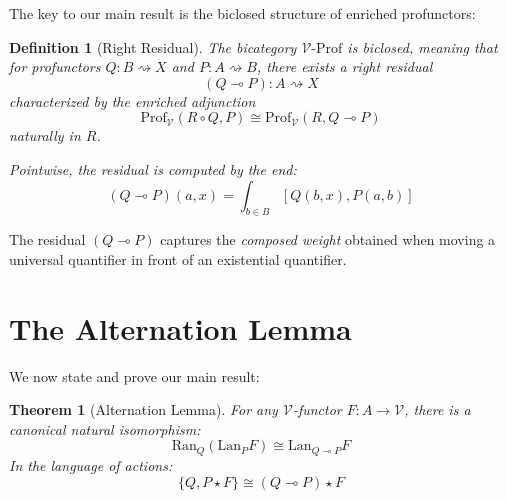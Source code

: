 \documentclass[11pt]{article}
\numberwithin{equation}{section}
\theoremstyle{upright}
\newtheorem{theorem}{Theorem}
\newtheorem{definition}{Definition}
\newcommand{\V}{\mathcal{V}}
\newcommand{\Prof}{\mathrm{Prof}}
\newcommand{\ProfV}{\Prof_{\V}}
\newcommand{\Lan}{\mathrm{Lan}}
\newcommand{\Ran}{\mathrm{Ran}}
\newcommand{\profto}{\rightsquigarrow}
\begin{document}
The key to our main result is the biclosed structure of enriched profunctors:

\begin{definition}[Right Residual]
The bicategory $\V\text{-}\Prof$ is \emph{biclosed}, meaning that for profunctors $Q: B \profto X$ and $P: A \profto B$, there exists a \emph{right residual}
\begin{equation}
(Q \multimap P): A \profto X
\end{equation}
characterized by the enriched adjunction
\begin{equation}
\ProfV(R \circ Q, P) \cong \ProfV(R, Q \multimap P)
\end{equation}
naturally in $R$.

Pointwise, the residual is computed by the end:
\begin{equation}
(Q \multimap P)(a,x) = \int_{b \in B} [Q(b,x), P(a,b)]
\end{equation}
\end{definition}

The residual $(Q \multimap P)$ captures the \emph{composed weight} obtained when moving a universal quantifier in front of an existential quantifier.

\section{The Alternation Lemma}

We now state and prove our main result:

\begin{theorem}[Alternation Lemma]\label{thm:alternation}
For any $\V$-functor $F: A \to \V$, there is a canonical natural isomorphism:
\begin{equation}
\boxed{\Ran_Q(\Lan_P F) \cong \Lan_{Q \multimap P} F}
\end{equation}
In the language of actions:
\begin{equation}
\{Q, P \star F\} \cong (Q \multimap P) \star F
\end{equation}
\end{theorem}
\end{document}
